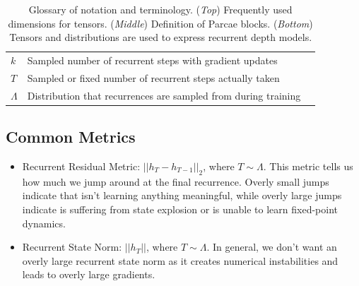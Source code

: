 \begin{table}[h]
\begin{tabular}{lll}
         $k$ & Sampled number of recurrent steps with gradient updates \\
         $T$ & Sampled or fixed number of recurrent steps actually taken \\
         $\Lambda$ & Distribution that recurrences are sampled from during training \\
    \bottomrule
    \end{tabular}
    \caption{Glossary of notation and terminology. (\textit{Top}) Frequently used dimensions for tensors. (\textit{Middle}) Definition of Parcae blocks. (\textit{Bottom}) Tensors and distributions are used to express recurrent depth models.} 
    \label{tab:placeholder}
\end{table}

\subsection{Common Metrics}
\label{sec:metrics}
\begin{itemize}
    \item Recurrent Residual Metric: $||h_T - h_{T-1}||_2$, where $T \sim \Lambda$. This metric tells us how much we jump around at the final recurrence. Overly small jumps indicate that \recurrent isn't learning anything meaningful, while overly large jumps indicate \recurrent is suffering from state explosion or is unable to learn fixed-point dynamics.
    \item Recurrent State Norm: $||h_T||$, where $T \sim \Lambda$. In general, we don't want an overly large recurrent state norm as it creates numerical instabilities and leads to overly large gradients.
\end{itemize}



